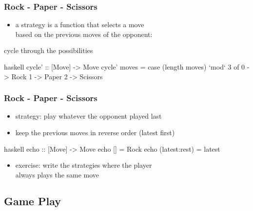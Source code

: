 \documentclass[dvipsnames]{beamer}
\theoremstyle{plain}
\begin{document}
\begin{frame}[fragile]
  \frametitle{Rock - Paper - Scissors}

  \begin{itemize}
    \item a strategy is a function that selects a move\\
      based on the previous moves of the opponent:\\
      \smallskip
  \end{itemize}

  \pause
  \begin{exampleblock}{cycle through the possibilities}
    \begin{pygments}{haskell}
cycle' :: [Move] -> Move
cycle' moves =
    case (length moves) `mod` 3 of
      0 -> Rock
      1 -> Paper
      2 -> Scissors
    \end{pygments}
  \end{exampleblock}
\end{frame}

\begin{frame}[fragile]
  \frametitle{Rock - Paper - Scissors}

  \begin{itemize}
    \item strategy: play whatever the opponent played last
    \item keep the previous moves in reverse order (latest first)
  \end{itemize}

  \begin{exampleblock}{}
    \begin{pygments}{haskell}
echo :: [Move] -> Move
echo []            = Rock
echo (latest:rest) = latest
    \end{pygments}
  \end{exampleblock}

  \pause
  \begin{itemize}
    \item exercise: write the strategies where the player\\
      always plays the same move
  \end{itemize}
\end{frame}

\subsection{Game Play}
\end{document}
